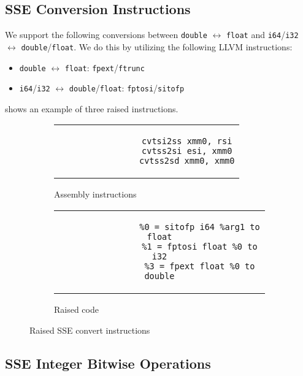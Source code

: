 \subsection{SSE Conversion Instructions}\label{subsec:sse-conversion-instructions}

We support the following conversions between \texttt{double} $\leftrightarrow$ \texttt{float} and \texttt{i64}/\texttt{i32} $\leftrightarrow$ \texttt{double}/\texttt{float}.
We do this by utilizing the following LLVM instructions:

\begin{itemize}
    \item \texttt{double} $\leftrightarrow$ \texttt{float}: \texttt{fpext}/\texttt{ftrunc}
    \item \texttt{i64}/\texttt{i32} $\leftrightarrow$ \texttt{double}/\texttt{float}: \texttt{fptosi}/\texttt{sitofp}
\end{itemize}
 shows an example of three raised instructions.

\begin{figure}[htpb]
    \centering
    \begin{subfigure}{.45\textwidth}
        \begin{tabular}{c}
            \begin{lstlisting}
                cvtsi2ss xmm0, rsi
                cvtss2si esi, xmm0
                cvtss2sd xmm0, xmm0
            \end{lstlisting}
        \end{tabular}
        \caption{Assembly instructions}
    \end{subfigure}
    \hfill%
    \begin{subfigure}{.45\textwidth}
        \begin{tabular}{c}
            \begin{lstlisting}
                %0 = sitofp i64 %arg1 to float
                %1 = fptosi float %0 to i32
                %3 = fpext float %0 to double
            \end{lstlisting}
        \end{tabular}
        \caption{Raised code}
    \end{subfigure}
    \caption{Raised SSE convert instructions}
    \label{fig:raised-fp-cvt}
\end{figure}

\subsection{SSE Integer Bitwise Operations}\label{subsec:sse-integer-bitwise-operations}

